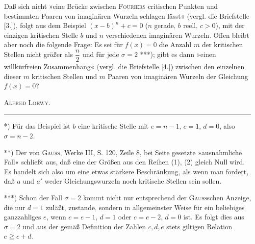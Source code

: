 {Daß sich nicht »eine Brücke zwischen \textsc{Fouriers} critischen Punkten und bestimmten Paaren von imaginären
Wurzeln schlagen lässt« (vergl. die Briefstelle [3.]), folgt aus dem Beispiel $(x-b)^n+c=0$ ($n$ gerade,
$b$ reell, $c>0$), mit der einzigen kritischen Stelle $b$ und $n$ verschiedenen imaginären Wurzeln. Offen bleibt
aber noch die folgende Frage: Es sei für $f(x)=0$ die Anzahl $m$ der kritischen Stellen nicht größer als $\dfrac n2$
und für jede $\sigma=2$ ***); gibt es dann »einen willkürfreien Zusammenhang« (vergl. die Briefstelle [4.]) zwischen
den einzelnen dieser $m$ kritischen Stellen und $m$ Paaren von imaginären Wurzeln der Gleichung $f(x)=0$?
\par\hfill\textsc{Alfred Loewy}.\par
\smallskip\noindent\rule{.25\linewidth}{.4pt}\par\smallskip
\noindent\hspace*{\parindent}*) Für das Beispiel ist $b$ eine kritische Stelle mit $e=n-1$, $c=1$, $d=0$, also $\sigma=n-2$.
\par\noindent\hspace*{\parindent}**) Der von \textsc{Gauss}, Werke III, S. 120, Zeile 8, bei Seite gesetzte »ausnahmliche Fall« schließt aus,
daß eine der Größen aus den Reihen (1), (2) gleich Null wird. Es handelt sich also um eine etwas stärkere
Beschränkung, als wenn man fordert, daß $a$ und $a'$ weder Gleichungswurzeln noch kritische Stellen sein sollen.
\par\noindent\hspace*{\parindent}***) Schon der Fall $\sigma=2$ kommt nicht nur entsprechend der \textsc{Gauss}schen Anzeige, die nur $d=1$
zuläßt, zustande, sondern in allgemeinster Weise für ein beliebiges ganzzahliges $e$, wenn $c=e-1$, $d=1$
oder $c=e-2$, $d=0$ ist. Es folgt dies aus $\sigma=2$ und aus der gemäß Definition der Zahlen $c,d,e$
stets giltigen Relation $e\geqq c+d$.
\par}
\ClosingRule
